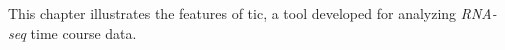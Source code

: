 This chapter illustrates the features of \gls{tic}, a tool developed for analyzing \textit{RNA-seq} time course data.

